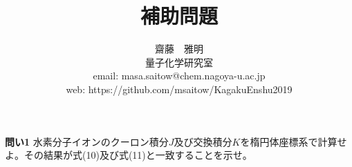 \documentclass[11pt,pra,aps]{revtex4}
\begin{document}
\title{補助問題}
\author{齋藤　雅明 \\ 量子化学研究室 \\ email: masa.saitow@chem.nagoya-u.ac.jp \\ web: https://github.com/msaitow/KagakuEnshu2019}

\maketitle

\noindent
{\bf 問い1} 水素分子イオンのクーロン積分$J$及び交換積分$K$を楕円体座標系で計算せよ。その結果が式(10)及び式(11)と一致することを示せ。
\end{document}
